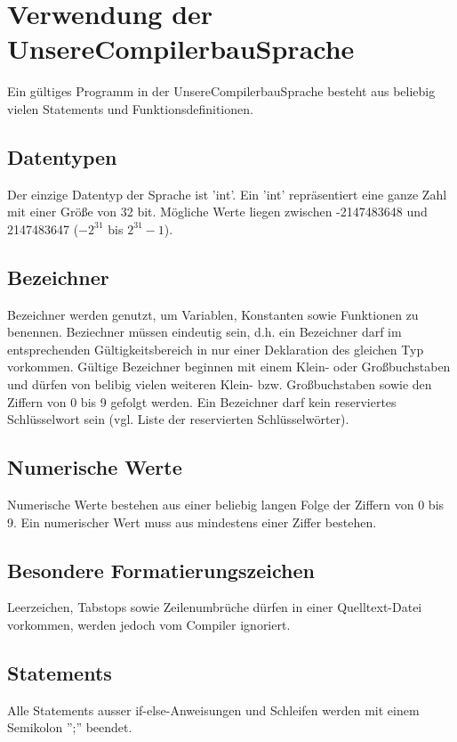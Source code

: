
\section{Verwendung der UnsereCompilerbauSprache}
Ein gültiges Programm in der UnsereCompilerbauSprache besteht aus beliebig vielen Statements und Funktionsdefinitionen. 

\subsection{Datentypen}
Der einzige Datentyp der Sprache ist 'int'. Ein 'int' repräsentiert eine ganze Zahl mit einer Größe von 32 bit. Mögliche Werte liegen zwischen -2147483648 und 2147483647 ($-2^{31}$ bis $2^{31} - 1$).

\subsection{Bezeichner}
Bezeichner werden genutzt, um Variablen, Konstanten sowie Funktionen zu benennen.
Beziechner müssen eindeutig sein, d.h. ein Bezeichner darf im entsprechenden Gültigkeitsbereich in nur einer Deklaration des gleichen Typ vorkommen. Gültige Bezeichner beginnen mit einem Klein- oder Großbuchstaben und dürfen von belibig vielen weiteren Klein- bzw. Großbuchstaben sowie den Ziffern von 0 bis 9 gefolgt werden. Ein Bezeichner darf kein reserviertes Schlüsselwort sein (vgl. Liste der reservierten Schlüsselwörter).

\subsection{Numerische Werte}
Numerische Werte bestehen aus einer beliebig langen Folge der Ziffern von 0 bis 9. Ein numerischer Wert muss aus mindestens einer Ziffer bestehen.

\subsection{Besondere Formatierungszeichen} 
Leerzeichen, Tabstops sowie Zeilenumbrüche dürfen in einer Quelltext-Datei vorkommen, werden jedoch vom Compiler ignoriert.


\subsection{Statements}
Alle Statements ausser if-else-Anweisungen und Schleifen werden mit einem Semikolon '';'' beendet.

